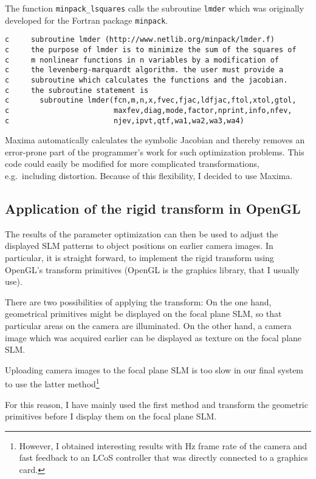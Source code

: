 The function \verb!minpack_lsquares! calls the subroutine \verb!lmder!
which was originally developed for the Fortran package \verb!minpack!.
\begin{lstlisting}[style=myfortran]
c     subroutine lmder (http://www.netlib.org/minpack/lmder.f)
c     the purpose of lmder is to minimize the sum of the squares of
c     m nonlinear functions in n variables by a modification of
c     the levenberg-marquardt algorithm. the user must provide a
c     subroutine which calculates the functions and the jacobian.
c     the subroutine statement is
c       subroutine lmder(fcn,m,n,x,fvec,fjac,ldfjac,ftol,xtol,gtol,
c                        maxfev,diag,mode,factor,nprint,info,nfev,
c                        njev,ipvt,qtf,wa1,wa2,wa3,wa4)
\end{lstlisting}
Maxima automatically calculates the symbolic Jacobian and thereby
removes an error-prone part of the programmer's work for such
optimization problems. This code could easily be modified for more
complicated transformations, e.g.\ including distortion. Because of
this flexibility, I decided to use Maxima.


\subsection{Application of the rigid transform in OpenGL}
\label{sec:map_opengl}
The results of the parameter optimization can then be used to adjust
the displayed SLM patterns to object positions on earlier camera
images. In particular, it is straight forward, to implement the rigid
transform using OpenGL's transform primitives (OpenGL is the graphics
library, that I usually use).

There are two possibilities of applying the transform: On the one
hand, geometrical primitives might be displayed on the focal plane
SLM, so that particular areas on the camera are illuminated.  On the
other hand, a camera image which was acquired earlier can be displayed
as texture on the focal plane SLM.

Uploading camera images to the focal plane SLM is too slow in our
final system to use the latter method\footnote{However, I obtained
  interesting results with \unit[30]{Hz} frame rate of the camera and
  fast feedback to an LCoS controller that was directly connected to a
  graphics card.}

For this reason, I have mainly used the first method and transform the
geometric primitives before I display them on the focal plane SLM.

